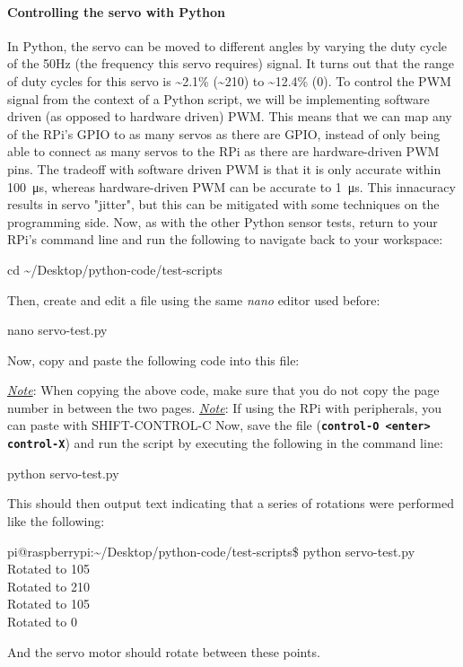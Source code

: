 \documentclass{article}
\newcommand*{\myfont}{\fontfamily{pcr}\selectfont}
\newcommand{\codeb}[2]{
  \begin{tcolorbox}[width=\textwidth,colback={SpringGreen},title={#1},colbacktitle=darkgreen,coltitle=SpringGreen]
    \myfont
    #2
  \end{tcolorbox}
} %
\newcommand{\outputb}[2]{
  \begin{tcolorbox}[width=\textwidth,colback={light-gray},title={#1},colbacktitle=gray,coltitle=light-gray]
    \myfont
    #2
  \end{tcolorbox}
} %
\newcommand{\note}[1]{\underline{\textit{Note}}: #1}
\begin{document}
    \paragraph{Controlling the servo with Python}
    In Python, the servo can be moved to different angles by varying the duty cycle of the 50Hz (the frequency this servo requires) signal. It turns out that the range of duty cycles for this servo is \textasciitilde2.1\% (\textasciitilde210\degree) to \textasciitilde12.4\% (0\degree). To control the PWM signal from the context of a Python script, we will be implementing software driven (as opposed to hardware driven) PWM. This means that we can map any of the RPi's GPIO to as many servos as there are GPIO, instead of only being able to connect as many servos to the RPi as there are hardware-driven PWM pins. The tradeoff with software driven PWM is that it is only accurate within \SI{100}{\micro\second}, whereas hardware-driven PWM can be accurate to \SI{1}{\micro\second}. This innacuracy results in servo "jitter", but this can be mitigated with some techniques on the programming side. Now, as with the other Python sensor tests, return to your RPi's command line and run the following to navigate back to your workspace:
    \codeb{Navigate to your workspace}
    {
      cd  \textasciitilde/Desktop/python-code/test-scripts
    }
    Then, create and edit a file using the same \textit{nano} editor used before:
    \codeb{Create servo Python testing script file}
    {
      nano servo-test.py
    }
    Now, copy and paste the following code into this file:
     
    \note{When copying the above code, make sure that you do not copy the page number in between the two pages.}
    \newline
    \note{If using the RPi with peripherals, you can paste with SHIFT-CONTROL-C}
    \newline
    \newline
    \noindent
    Now, save the file (\texttt{\textbf{control-O <enter> control-X}}) and run the script by executing the following in the command line:
    \codeb{Run the test script for the servo motor}
    {
      python servo-test.py
    }
    This should then output text indicating that a series of rotations were performed like the following:
    \outputb{Test script output for servo motor}
    {
      pi@raspberrypi:\textasciitilde/Desktop/python-code/test-scripts\$ python servo-test.py \\
      Rotated to 105\degree                                                        \\
      Rotated to 210\degree                                                        \\
      Rotated to 105\degree                                                        \\
      Rotated to 0\degree
    }
    And the servo motor should rotate between these points.
\end{document}
